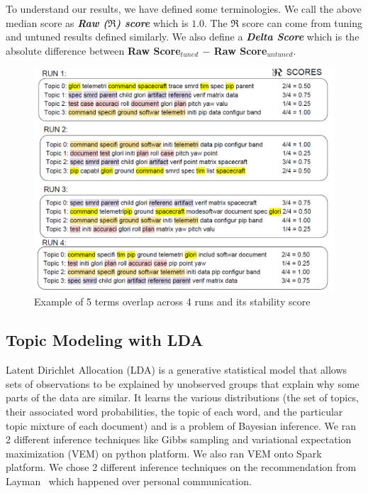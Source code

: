 \documentclass[conference]{IEEEtran}
\theoremstyle{break}
\begin{document}
To understand our results, we have defined some terminologies. We call the above median score as \textbf{\textit{Raw ($\Re$) score}} which is $1.0$. The \textbf{$\Re$} score can come from tuning and untuned results defined similarly. We also define a \textbf{\textit{Delta Score}} which is the absolute difference between \textbf{Raw Score$_{tuned}$ $-$ Raw Score$_{untuned}$}.

\begin{figure}[!htbp]
  \captionsetup{justification=centering}
  \includegraphics[width=\linewidth]{./fig/jaccard.png}
  \caption{Example of 5 terms overlap across 4 runs and its stability score}
  \label{fig: jaccard}
\end{figure}

\subsection{Topic Modeling with LDA}
\label{sect: LDA}
Latent Dirichlet Allocation (LDA) is a generative statistical model that allows sets of observations to be explained by unobserved groups that explain why some parts of the data are similar. It learns the various distributions (the set of topics, their associated word probabilities, the topic of each word, and the particular topic mixture of each document) and is a problem of Bayesian inference. We ran 2 different inference techniques like Gibbs sampling and variational expectation maximization (VEM) on python platform. We also ran VEM onto Spark platform. We chose 2 different inference techniques on the recommendation from Layman~\cite{layman16a, layman2016topic} which happened over personal communication.
\end{document}
